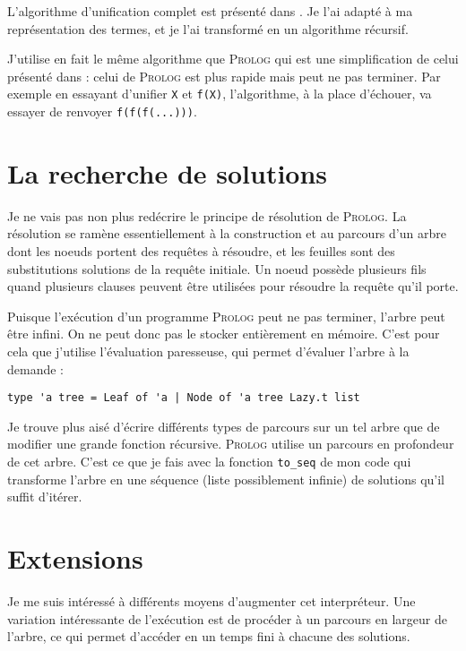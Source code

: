 \documentclass{article}
\begin{document}
L'algorithme d'unification complet est présenté dans \cite{NilssonMaluszynski}.  Je l'ai adapté à ma représentation des termes, et je l'ai transformé en un algorithme récursif.

J'utilise en fait le même algorithme que \textsc{Prolog} qui est une simplification de celui présenté dans \cite{NilssonMaluszynski} : celui de \textsc{Prolog} est plus rapide mais peut ne pas terminer. Par exemple en essayant d'unifier \texttt{X} et \texttt{f(X)}, l'algorithme, à la place d'échouer, va essayer de renvoyer \texttt{f(f(f(...)))}.

\section{La recherche de solutions}

Je ne vais pas non plus redécrire le principe de résolution de \textsc{Prolog}. La résolution se ramène essentiellement à la construction et au parcours d'un arbre dont les noeuds portent des requêtes à résoudre, et les feuilles sont des substitutions solutions de la requête initiale. Un noeud possède plusieurs fils quand plusieurs clauses peuvent être utilisées pour résoudre la requête qu'il porte.

Puisque l'exécution d'un programme \textsc{Prolog} peut ne pas terminer, l'arbre peut être infini. On ne peut donc pas le stocker entièrement en mémoire. C'est pour cela que j'utilise l'évaluation paresseuse, qui permet d'évaluer l'arbre à la demande :

\begin{verbatim}
type 'a tree = Leaf of 'a | Node of 'a tree Lazy.t list
\end{verbatim}

Je trouve plus aisé d'écrire différents types de parcours sur un tel arbre que de modifier une grande fonction récursive. \textsc{Prolog} utilise un parcours en profondeur de cet arbre. C'est ce que je fais avec la fonction \texttt{to_seq} de mon code qui transforme l'arbre en une séquence (liste possiblement infinie) de solutions qu'il suffit d'itérer. 

\section{Extensions}

Je me suis intéressé à différents moyens d'augmenter cet interpréteur. Une variation intéressante de l'exécution est de procéder à un parcours en largeur de l'arbre, ce qui permet d'accéder en un temps fini à chacune des solutions.
\end{document}
